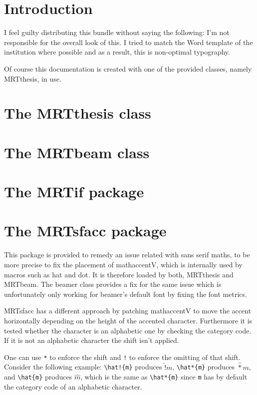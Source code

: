 \documentclass[oneside]{MRTthesis}
\newcommand*\pkg[1]{\textrm{#1}}
\newcommand*\cls[1]{\textrm{#1}}
\newcommand*\cs{\texorpdfstring{\csTeXString}{\csPDFString}}
\def\csPDFString#1{(macro #1)}
\begin{document}
\tableofcontents
\mainpart
\chapter{Introduction}
I feel guilty distributing this bundle without saying the following: I'm not
responsible for the overall look of this. I tried to match the Word template of
the institution where possible and as a result, this is non-optimal typography.

Of course this documentation is created with one of the provided classes, namely
\cls{MRTthesis}, in use.

\chapter{The \cls{MRTthesis} class}
\chapter{The \cls{MRTbeam} class}
\chapter{The \pkg{MRTif} package}
\chapter{The \pkg{MRTsfacc} package}
This package is provided to remedy an issue related with sans serif maths, to be
more precise to fix the placement of \cs{mathaccentV}, which is internally used
by macros such as \cs{hat} and \cs{dot}. It is therefore loaded by both,
\cls{MRTthesis} and \cls{MRTbeam}. The \cls{beamer} class provides a fix for the
same issue which is unfortunately only working for \cls{beamer}'s default font
by fixing the font metrics.

\cls{MRTsfacc} has a different approach by patching \cs{mathaccentV} to move the
accent horizontally depending on the height of the accented character.
Furthermore it is tested whether the character is an alphabetic one by checking
the category code. If it is not an alphabetic character the shift isn't applied.

One can use \texttt{*} to enforce the shift and \texttt{!} to enforce the
omitting of that shift. Consider the following example:
\verb$\hat!{m}$ produces $\hat!{m}$, \verb$\hat*{m}$ produces $\hat*{m}$, and
\verb$\hat{m}$ produces $\hat{m}$, which is the same as \verb$\hat*{m}$ since
\texttt{m} has by default the category code of an alphabetic character.
\end{document}
